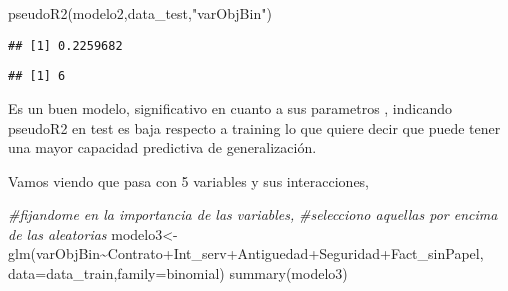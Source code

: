 \documentclass[
]{article}
\newenvironment{Shaded}{\begin{snugshade}}{\end{snugshade}}
\newcommand{\AttributeTok}[1]{\textcolor[rgb]{0.77,0.63,0.00}{#1}}
\newcommand{\CommentTok}[1]{\textcolor[rgb]{0.56,0.35,0.01}{\textit{#1}}}
\newcommand{\FunctionTok}[1]{\textcolor[rgb]{0.00,0.00,0.00}{#1}}
\newcommand{\NormalTok}[1]{#1}
\newcommand{\OtherTok}[1]{\textcolor[rgb]{0.56,0.35,0.01}{#1}}
\newcommand{\SpecialCharTok}[1]{\textcolor[rgb]{0.00,0.00,0.00}{#1}}
\newcommand{\StringTok}[1]{\textcolor[rgb]{0.31,0.60,0.02}{#1}}
\begin{document}
\begin{Shaded}
\begin{Highlighting}[]
\FunctionTok{pseudoR2}\NormalTok{(modelo2,data\_test,}\StringTok{"varObjBin"}\NormalTok{)}
\end{Highlighting}
\end{Shaded}

\begin{verbatim}
## [1] 0.2259682
\end{verbatim}

\begin{Shaded}
\end{Shaded}

\begin{verbatim}
## [1] 6
\end{verbatim}

Es un buen modelo, significativo en cuanto a sus parametros , indicando
pseudoR2 en test es baja respecto a training lo que quiere decir que
puede tener una mayor capacidad predictiva de generalización.

Vamos viendo que pasa con 5 variables y sus interacciones,

\begin{Shaded}
\begin{Highlighting}[]
\CommentTok{\#fijandome en la importancia de las variables, }
\CommentTok{\#selecciono aquellas por encima de las aleatorias}
\NormalTok{modelo3}\OtherTok{\textless{}{-}}\FunctionTok{glm}\NormalTok{(varObjBin}\SpecialCharTok{\textasciitilde{}}\NormalTok{Contrato}\SpecialCharTok{+}\NormalTok{Int\_serv}\SpecialCharTok{+}\NormalTok{Antiguedad}\SpecialCharTok{+}\NormalTok{Seguridad}\SpecialCharTok{+}\NormalTok{Fact\_sinPapel,}
             \AttributeTok{data=}\NormalTok{data\_train,}\AttributeTok{family=}\NormalTok{binomial)}
\FunctionTok{summary}\NormalTok{(modelo3)}
\end{Highlighting}
\end{Shaded}
\end{document}
